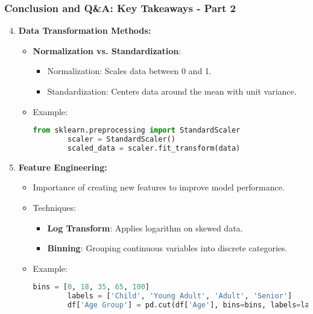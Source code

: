 \documentclass[aspectratio=169]{beamer}
\begin{document}
\begin{frame}[fragile]
  \frametitle{Conclusion and Q\&A: Key Takeaways - Part 2}
  \begin{enumerate}
    \setcounter{enumi}{3} %
    \item \textbf{Data Transformation Methods:}
      \begin{itemize}
        \item \textbf{Normalization vs. Standardization}:
          \begin{itemize}
            \item Normalization: Scales data between 0 and 1.
            \item Standardization: Centers data around the mean with unit variance.
          \end{itemize}
        \item Example: 
        \begin{lstlisting}[language=Python]
        from sklearn.preprocessing import StandardScaler
        scaler = StandardScaler()
        scaled_data = scaler.fit_transform(data)
        \end{lstlisting}
      \end{itemize}

    \item \textbf{Feature Engineering:}
      \begin{itemize}
        \item Importance of creating new features to improve model performance.
        \item Techniques:
          \begin{itemize}
            \item \textbf{Log Transform}: Applies logarithm on skewed data.
            \item \textbf{Binning}: Grouping continuous variables into discrete categories.
          \end{itemize}
        \item Example: 
        \begin{lstlisting}[language=Python]
        bins = [0, 18, 35, 65, 100]
        labels = ['Child', 'Young Adult', 'Adult', 'Senior']
        df['Age Group'] = pd.cut(df['Age'], bins=bins, labels=labels)
        \end{lstlisting}
      \end{itemize}
  \end{enumerate}
\end{frame}
\end{document}
